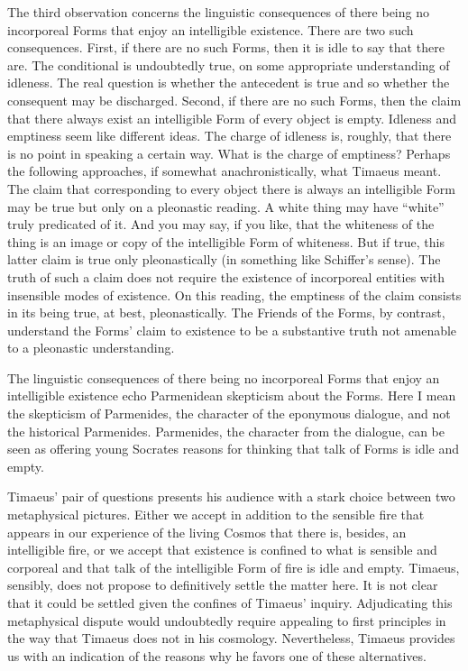 The third observation concerns the linguistic consequences of there being no incorporeal Forms that enjoy an intelligible existence. There are two such consequences. First, if there are no such Forms, then it is idle to say that there are. The conditional is undoubtedly true, on some appropriate understanding of idleness. The real question is whether the antecedent is true and so whether the consequent may be discharged. Second, if there are no such Forms, then the claim that there always exist an intelligible Form of every object is empty. Idleness and emptiness seem like different ideas. The charge of idleness is, roughly, that there is no point in speaking a certain way. What is the charge of emptiness? Perhaps the following approaches, if somewhat anachronistically, what Timaeus meant. The claim that corresponding to every object there is always an intelligible Form may be true but only on a pleonastic reading. A white thing may have ``white'' truly predicated of it. And you may say, if you like, that the whiteness of the thing is an image or copy of the intelligible Form of whiteness. But if true, this latter claim is true only pleonastically (in something like Schiffer's \citeyear{Schiffer:1987aa} sense). The truth of such a claim does not require the existence of incorporeal entities with insensible modes of existence. On this reading, the emptiness of the claim consists in its being true, at best, pleonastically. The Friends of the Forms, by contrast, understand the Forms' claim to existence to be a substantive truth not amenable to a pleonastic understanding.

The linguistic consequences of there being no incorporeal Forms that enjoy an intelligible existence echo Parmenidean skepticism about the Forms. Here I mean the skepticism of Parmenides, the character of the eponymous dialogue, and not the historical Parmenides. Parmenides, the character from the dialogue, can be seen as offering young Socrates reasons for thinking that talk of Forms is idle and empty.

Timaeus' pair of questions presents his audience with a stark choice between two metaphysical pictures. Either we accept in addition to the sensible fire that appears in our experience of the living Cosmos that there is, besides, an intelligible fire, or we accept that existence is confined to what is sensible and corporeal and that talk of the intelligible Form of fire is idle and empty. Timaeus, sensibly, does not propose to definitively settle the matter here. It is not clear that it could be settled given the confines of Timaeus' inquiry. Adjudicating this metaphysical dispute would undoubtedly require appealing to first principles in the way that Timaeus does not in his cosmology. Nevertheless, Timaeus provides us with an indication of the reasons why he favors one of these alternatives.

